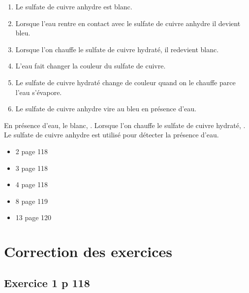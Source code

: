 \documentclass[12pt,a4paper]{article}
\begin{document}
\begin{myact}{}
	\begin{enumerate}
		\item Le sulfate de cuivre anhydre est blanc.
		\item Lorsque l'eau rentre en contact avec le sulfate de cuivre anhydre il devient bleu.
		\item Lorsque l'on chauffe le sulfate de cuivre hydraté, il redevient blanc.
		\item L'eau fait changer la couleur du sulfate de cuivre.
		\item Le sulfate de cuivre hydraté change de couleur quand on le chauffe parce l'eau s'évapore.
		\item Le sulfate de cuivre anhydre vire au bleu en présence d'eau.
	\end{enumerate}
\end{myact}

\begin{mybilan}
	En présence d'eau, le  blanc, .
	Lorsque l'on chauffe le sulfate de cuivre hydraté, .
	Le sulfate de cuivre anhydre est utilisé pour détecter la présence d'eau.
\end{mybilan}

\begin{myexos}
	\begin{multicols}{2}
	
		\begin{itemize}
			\item 2 page 118
			\item 3 page 118
			\item 4 page 118
			\item 8 page 119
			\item 13 page 120
		\end{itemize}
	
	\end{multicols}
\end{myexos}


\appendix

\newpage

\section*{Correction des exercices}

\subsection*{Exercice 1 p 118}
\end{document}
